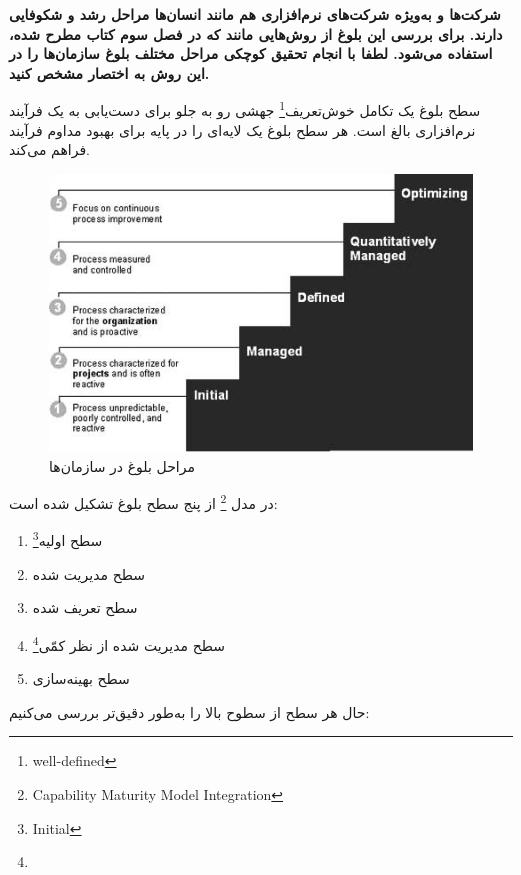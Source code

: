 

\textbf{شرکت‌ها و به‌ویژه شرکت‌های نرم‌افزاری هم مانند انسان‌ها مراحل رشد و شکوفایی دارند. برای بررسی این بلوغ از روش‌هایی مانند  که در فصل سوم کتاب مطرح شده، استفاده می‌شود. لطفا با انجام تحقیق کوچکی مراحل مختلف بلوغ سازمان‌ها را در این روش به اختصار مشخص کنید.}


سطح بلوغ یک تکامل خوش‌تعریف\footnote{well-defined} جهشی رو به جلو برای دست‌یابی به یک فرآیند نرم‌افزاری بالغ است. هر سطح بلوغ یک لایه‌ای را در پایه برای بهبود مداوم فرآیند فراهم می‌کند. 
\begin{figure}[!h]
	\begin{center}
		\includegraphics[scale=0.7]{./3.jpg}
	\end{center}
	\caption{مراحل بلوغ در سازمان‌ها}
\end{figure}

در مدل  \footnote{Capability Maturity Model Integration} از پنج سطح بلوغ تشکیل شده است:
\begin{enumerate}
	\item سطح اولیه\footnote{Initial}
	\item سطح مدیریت شده
	\item سطح تعریف شده
	\item سطح مدیریت شده از نظر کمّی\footnote{}
	\item سطح بهینه‌سازی
	
\end{enumerate}

حال هر سطح از سطوح بالا را به‌طور دقیق‌تر بررسی می‌کنیم:

